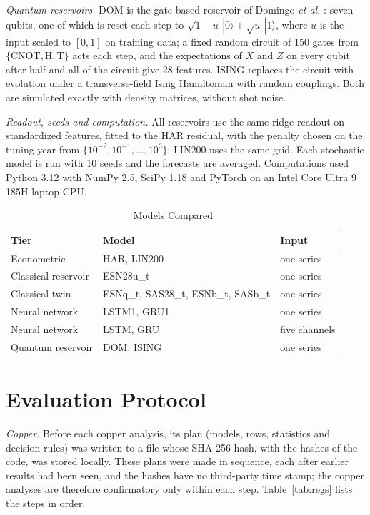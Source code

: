 \documentclass{ieeeaccess}
\begin{document}
\textit{Quantum reservoirs.} DOM is the gate-based reservoir of Domingo \emph{et al.} \cite{domingo2026}: seven qubits, one of which is reset each step to $\sqrt{1-u}\,|0\rangle+\sqrt{u}\,|1\rangle$, where $u$ is the input scaled to $[0,1]$ on training data; a fixed random circuit of 150 gates from $\{\mathrm{CNOT},\mathrm{H},\mathrm{T}\}$ acts each step, and the expectations of $X$ and $Z$ on every qubit after half and all of the circuit give 28 features. ISING replaces the circuit with evolution under a transverse-field Ising Hamiltonian with random couplings. Both are simulated exactly with density matrices, without shot noise.

\textit{Readout, seeds and computation.} All reservoirs use the same ridge readout on standardized features, fitted to the HAR residual, with the penalty chosen on the tuning year from $\{10^{-2},10^{-1},\dots,10^{3}\}$; LIN200 uses the same grid. Each stochastic model is run with 10 seeds and the forecasts are averaged. Computations used Python 3.12 with NumPy 2.5, SciPy 1.18 and PyTorch on an Intel Core Ultra 9 185H laptop CPU.

\begin{table}[t]
\caption{Models Compared}
\label{tab:models}
\centering
\begin{tabular}{lll}
\hline
Tier & Model & Input \\
\hline
Econometric & HAR, LIN200 & one series \\
Classical reservoir & ESN28u\_t & one series \\
Classical twin & ESNq\_t, SAS28\_t, ESNb\_t, SASb\_t & one series \\
Neural network & LSTM1, GRU1 & one series \\
Neural network & LSTM, GRU & five channels \\
Quantum reservoir & DOM, ISING & one series \\
\hline
\end{tabular}
\end{table}

\section{Evaluation Protocol}
\label{sec:protocol}
\textit{Copper.} Before each copper analysis, its plan (models, rows, statistics and decision rules) was written to a file whose SHA-256 hash, with the hashes of the code, was stored locally. These plans were made in sequence, each after earlier results had been seen, and the hashes have no third-party time stamp; the copper analyses are therefore confirmatory only within each step. Table~\ref{tab:regs} lists the steps in order.
\end{document}
